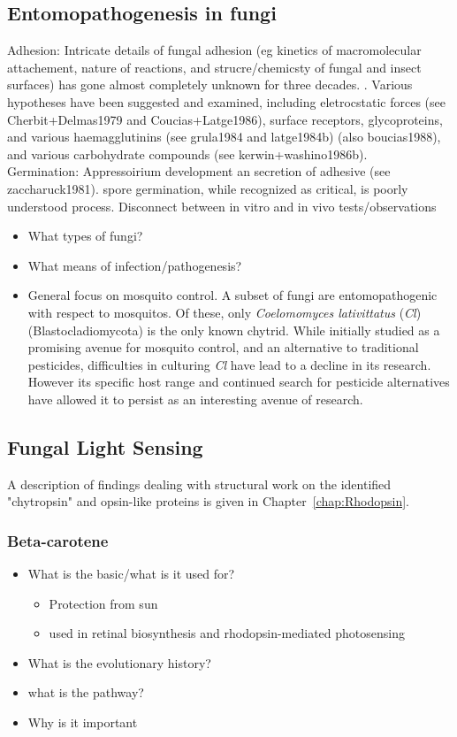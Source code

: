 \subsection{Entomopathogenesis in fungi}
Adhesion: Intricate details of fungal adhesion (eg kinetics of macromolecular attachement, nature of reactions, and strucre/chemicsty of fungal and insect surfaces) has gone almost completely unknown for three decades. \cite{atlasBook}. Various hypotheses have been suggested and examined, including eletrocstatic forces  (see Cherbit+Delmas1979 and Coucias+Latge1986), surface receptors, glycoproteins, and various haemagglutinins (see grula1984 and latge1984b) (also boucias1988), and various carbohydrate compounds (see kerwin+washino1986b). \\
\indent Germination: Appressoirium development an secretion of adhesive (see zaccharuck1981). spore germination, while recognized as critical, is poorly understood process. Disconnect between in vitro and in vivo tests/observations\\
\indent 
\begin{itemize}
  \item What types of fungi?
  \item What means of infection/pathogenesis?
  \item General focus on mosquito control. A subset of fungi are entomopathogenic with respect to mosquitos. Of these, only \textit{Coelomomyces lativittatus} (\textit{Cl}) (Blastocladiomycota) is the only known chytrid. While initially studied as a promising avenue for mosquito control, and an alternative to traditional pesticides, difficulties in culturing \textit{Cl} have lead to a decline in its research. However its specific host range and continued search for pesticide alternatives have allowed it to persist as an interesting avenue of research.\\
\end{itemize}
\subsection{Fungal Light Sensing}
A description of findings dealing with structural work on the identified "chytropsin" and opsin-like proteins is given in Chapter~\ref{chap:Rhodopsin}.\\
\subsubsection{Beta-carotene}
\begin{itemize}
  \item What is the basic/what is it used for?
  \begin{itemize}
    \item Protection from sun
    \item used in retinal biosynthesis and rhodopsin-mediated photosensing
  \end{itemize}
  \item What is the evolutionary history?
  \item what is the pathway?
  \item Why is it important
\end{itemize}

